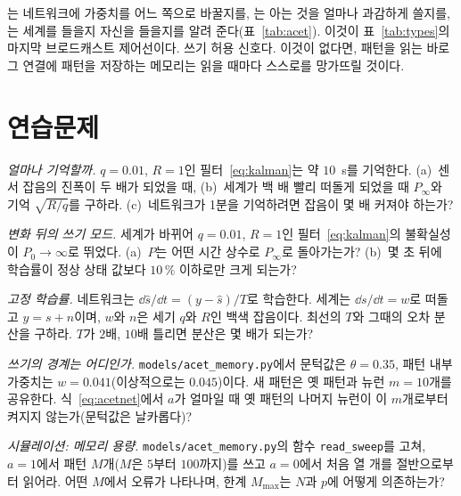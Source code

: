 는 네트워크에 가중치를 어느 쪽으로 바꿀지를, 는 아는 것을 얼마나 과감하게 쓸지를, 는 세계를 들을지 자신을 들을지를 알려 준다(표~\ref{tab:acet}). 이것이 표~\ref{tab:types}의 마지막 브로드캐스트 제어선이다. 쓰기 허용 신호다. 이것이 없다면, 패턴을 읽는 바로 그 연결에 패턴을 저장하는 메모리는 읽을 때마다 스스로를 망가뜨릴 것이다.

\section{연습문제}

\begin{exercise}[\lvlA]
\label{ex:09:1}
\emph{얼마나 기억할까.} $q=0.01$, $R=1$인 필터~\eqref{eq:kalman}는 약 $10$~s를 기억한다. (a)~센서 잡음의 진폭이 두 배가 되었을 때, (b)~세계가 백 배 빨리 떠돌게 되었을 때 $P_\infty$와 기억 $\sqrt{R/q}$를 구하라. (c)~네트워크가 1분을 기억하려면 잡음이 몇 배 커져야 하는가?
\end{exercise}

\begin{exercise}[\lvlB]
\label{ex:09:2}
\emph{변화 뒤의 쓰기 모드.} 세계가 바뀌어 $q=0.01$, $R=1$인 필터~\eqref{eq:kalman}의 불확실성이 $P_0\to\infty$로 뛰었다. (a)~$P$는 어떤 시간 상수로 $P_\infty$로 돌아가는가? (b)~몇 초 뒤에 학습률이 정상 상태 값보다 $10\,\%$ 이하로만 크게 되는가?
\end{exercise}

\begin{exercise}[\lvlB]
\label{ex:09:3}
\emph{고정 학습률.} 네트워크는 $\dd\hat s/\dd t=(y-\hat s)/T$로 학습한다. 세계는 $\dd s/\dd t=w$로 떠돌고 $y=s+n$이며, $w$와 $n$은 세기 $q$와 $R$인 백색 잡음이다. 최선의 $T$와 그때의 오차 분산을 구하라. $T$가 $2$배, $10$배 틀리면 분산은 몇 배가 되는가?
\end{exercise}

\begin{exercise}[\lvlB]
\label{ex:09:4}
\emph{쓰기의 경계는 어디인가.} \texttt{models/\allowbreak acet\_memory.py}에서 문턱값은 $\theta=0.35$, 패턴 내부 가중치는 $w=0.041$(이상적으로는 $0.045$)이다. 새 패턴은 옛 패턴과 뉴런 $m=10$개를 공유한다. 식~\eqref{eq:acetnet}에서 $a$가 얼마일 때 옛 패턴의 나머지 뉴런이 이 $m$개로부터 켜지지 않는가(문턱값은 날카롭다)?
\end{exercise}

\begin{exercise}[\lvlB]
\label{ex:09:5}
\emph{시뮬레이션: 메모리 용량.} \texttt{models/\allowbreak acet\_memory.py}의 함수 \texttt{read\_sweep}를 고쳐, $a=1$에서 패턴 $M$개($M$은 $5$부터 $100$까지)를 쓰고 $a=0$에서 처음 열 개를 절반으로부터 읽어라. 어떤 $M$에서 오류가 나타나며, 한계 $M_{\max}$는 $N$과 $p$에 어떻게 의존하는가?
\end{exercise}

